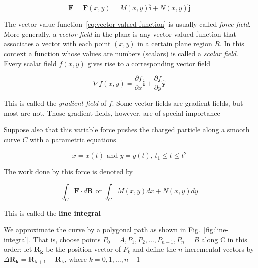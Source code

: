 \begin{equation}\label{eq:vector-valued-function}
    \boldsymbol{F} = \boldsymbol{F}(x, y) = M(x, y)\boldsymbol{\hat{i}} + N(x, y)\boldsymbol{\hat{j}}
\end{equation}

\begin{tcolorbox}[
    enhanced,
    arc=3mm,boxrule=1.5mm,
    frame hidden,colback=blue!10!white,
    borderline={1mm}{0mm}{blue,dotted}
]
    The vector-value function~\ref{eq:vector-valued-function} is usually called \textit{force field}. More generally,
    a \textit{vector field} in the plane is any vector-valued function that associates a vector with each point $(x, y)$
    in a certain plane region $R$. In this context a function whose values are numbers (scalars) is called a
    \textit{scalar field}. Every scalar field $f(x, y)$ gives rise to a corresponding vector field

    \begin{equation}
        \nabla f(x, y) = \frac{\partial f}{\partial x}\boldsymbol{\hat{i}} + \frac{\partial f}{\partial y}\boldsymbol{\hat{y}}
    \end{equation}

    This is called the \textit{gradient field} of $f$. Some vector fields are gradient fields, but most are not. Those
    gradient fields, however, are of special importance
\end{tcolorbox}

Suppose also that this variable force pushes the charged particle along a smooth curve $C$ with a parametric equations

\begin{equation}
    x = x(t) \text{\ \ \ \ \ \ and \ \ \ \ \ \ } y = y(t)\text{, \ \ \ \ \ \ } t_1 \le t \le t^2
\end{equation}

The work done by this force is denoted by

\begin{equation}
    \int_{C} \boldsymbol{F} \cdot d\boldsymbol{R} \text{\ \ \ \ \ \ or \ \ \ \ \ \ } \int_{C}M(x, y)dx + N(x, y)dy
\end{equation}

This is called the \textbf{line integral}

We approximate the curve by a polygonal path as shown in Fig.~\ref{fig:line-integral}. That is, choose points
$P_0 = A, P_1, P_2, \ldots, P_{n - 1}, P_n = B$ along C in this order; let $\boldsymbol{R_k}$ be the position vector of
$P_k$ and define the $n$ incremental vectors by $\Delta \boldsymbol{R_k} = \boldsymbol{R_{k + 1}} - \boldsymbol{R_k}$,
where $k = 0, 1, \ldots, n - 1$

